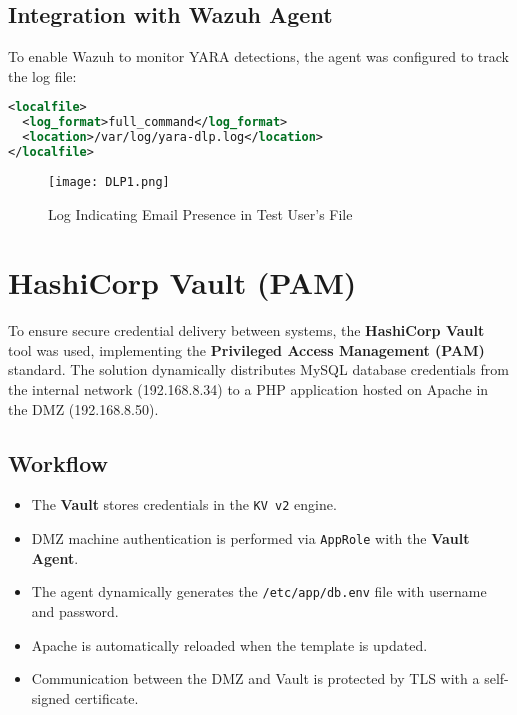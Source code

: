 \documentclass[12pt]{report}
\begin{document}
\subsection*{Integration with Wazuh Agent}

To enable Wazuh to monitor YARA detections, the agent was configured to track the log file:

\begin{lstlisting}[language=xml, caption={YARA Log Monitoring in Wazuh Agent}]
<localfile>
  <log_format>full_command</log_format>
  <location>/var/log/yara-dlp.log</location>
</localfile>
\end{lstlisting}

\begin{figure}[h]
    \centering
    \texttt{[image: DLP1.png]}
    \caption{Log Indicating Email Presence in Test User's File}
    \label{fig:yara-log}
\end{figure}

\clearpage

\section*{HashiCorp Vault (PAM)}

To ensure secure credential delivery between systems, the \textbf{HashiCorp Vault} tool was used, implementing the \textbf{Privileged Access Management (PAM)} standard. The solution dynamically distributes MySQL database credentials from the internal network (192.168.8.34) to a PHP application hosted on Apache in the DMZ (192.168.8.50).

\subsection*{Workflow}

\begin{itemize}
    \item The \textbf{Vault} stores credentials in the \texttt{KV v2} engine.
    \item DMZ machine authentication is performed via \texttt{AppRole} with the \textbf{Vault Agent}.
    \item The agent dynamically generates the \texttt{/etc/app/db.env} file with username and password.
    \item Apache is automatically reloaded when the template is updated.
    \item Communication between the DMZ and Vault is protected by TLS with a self-signed certificate.
\end{itemize}
\end{document}
